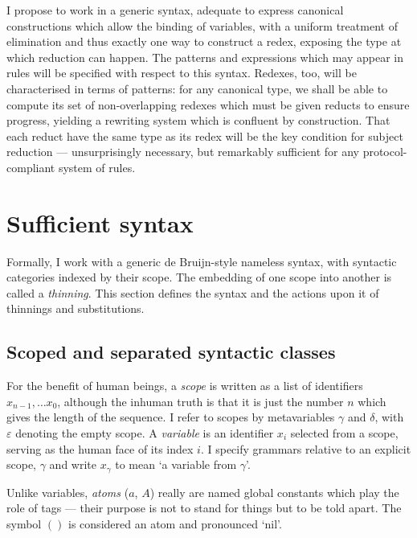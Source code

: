 \documentclass{jfp1}
\newcommand{\emp}{\varepsilon}
\begin{document}
I propose to work in a generic syntax, adequate to express canonical
constructions which allow the binding of variables, with a uniform
treatment of elimination and thus exactly one way to construct a
redex, exposing the type at which reduction can happen. The patterns
and expressions which may appear in rules will be specified with
respect to this syntax. Redexes, too, will be characterised in terms
of patterns: for any canonical type, we shall be able to compute its
set of non-overlapping redexes which must be given reducts to ensure
progress, yielding a rewriting system which is confluent by
construction. That each reduct have the same type as its redex
will be the key condition for subject reduction --- unsurprisingly
necessary, but remarkably sufficient for any protocol-compliant
system of rules.



\section{Sufficient syntax}

\newcommand{\la}[1]{\backslash #1\:}

Formally, I work with a generic de Bruijn-style nameless syntax, with syntactic
categories indexed by their scope. The embedding of one scope into another
is called a \emph{thinning}. This section defines the syntax and the actions
upon it of thinnings and substitutions.

\subsection{Scoped and separated syntactic classes}

For the benefit of human beings, a \emph{scope} is written as a list of identifiers $x_{n-1},\ldots x_0$, although the inhuman truth is that it is just the number $n$
which gives the length of the sequence. I refer to scopes by
metavariables $\gamma$ and $\delta$, with $\emp$ denoting the empty
scope. A \emph{variable} is an identifier $x_i$ selected from
a scope, serving as the human face of its index $i$. I specify grammars
relative to an explicit scope, $\gamma$ and write $x_\gamma$ to
mean `a variable from $\gamma$'.

Unlike variables, \emph{atoms} ($a$, $A$) really are named global
constants which play the role of tags --- their purpose is not
to stand for things but to be told apart. The symbol $()$ is
considered an atom and pronounced `nil'.
\end{document}
